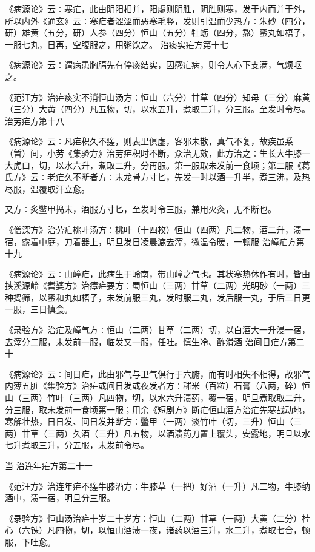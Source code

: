 \documentclass[a4paper,12pt,UTF8,twoside]{ctexbook}
\begin{document}
《病源论》云∶寒疟，此由阴阳相并，阳虚则阴胜，阴胜则寒，发于内而并于外，所以内外《通玄》云∶寒疟者涩涩而恶寒毛竖，发则引温而少热方∶朱砂（四分，研）雄黄（五分，研）人参（四分）恒山（五分）牡蛎（四分，熬）蜜丸如梧子，一服七丸，日再，空腹服之，用粥饮之。
治痰实疟方第十七

《病源论》云∶谓病患胸膈先有停痰结实，因感疟病，则令人心下支满，气烦呕之。

《范汪方》治疟痰实不消恒山汤方∶恒山（六分）甘草（四分）知母（三分）麻黄（三分）大黄（四分）凡五物，切，以水五升，煮取二升，分三服。至发时令尽。
治劳疟方第十八

《病源论》云∶凡疟积久不瘥，则表里俱虚，客邪未散，真气不复，故疾虽系（暂）间，小劳《集验方》治劳疟积时不断，众治无效，此方治之∶生长大牛膝一大虎口，切，以水六升，煮取二升，分再服。第一服取未发前一食顷；第二服《葛氏方》云∶老疟久不断者方∶末龙骨方寸匕，先发一时以酒一升半，煮三沸，及热尽服，温覆取汗立愈。

又方∶炙鳖甲捣末，酒服方寸匕，至发时令三服，兼用火灸，无不断也。

《僧深方》治劳疟桃叶汤方∶桃叶（十四枚）恒山（四两）凡二物，酒二升，渍一宿，露着中庭，刀着器上，明旦发日凌晨漉去滓，微温令暖，一顿服
治嶂疟方第十九

《病源论》云∶山嶂疟，此病生于岭南，带山嶂之气也。其状寒热休作有时，皆由挟溪源岭《耆婆方》治瘴疟要方∶蜀恒山（三两）甘草（二两）光明砂（一两）三种捣筛，以蜜和丸如梧子，未发前服三丸，发时服二丸，发后服一丸，于后三日更一服，三日慎食。

《录验方》治疟及嶂气方∶恒山（二两）甘草（二两）切，以白酒大一升浸一宿，去滓分二服，未发前一服，临发又一服，任吐。慎生冷、酢滑酒
治间日疟方第二十

《病源论》云∶间日疟，此由邪气与卫气俱行于六腑，而有时相失不相得，故邪气内薄五脏《集验方》治疟或间日发或夜发者方∶秫米（百粒）石膏（八两，碎）恒山（三两）竹叶（三两）凡四物，切，以水六升渍药，覆一宿，明旦煮取取二升，分三服，取未发前一食顷第一服；用余《短剧方》断疟恒山酒方治疟先寒战动地，寒解壮热，日日发、间日发并断方∶鳖甲（一两）淡竹叶（切，三升）恒山（三两）甘草（三两）久酒（三升）凡五物，以酒渍药刀置上覆头，安露地，明旦以水七升煮取三升，分五服，未发前令尽。

当
治连年疟方第二十一

《范汪方》治连年疟不瘥牛膝酒方∶牛膝草（一把）好酒（一升）凡二物，牛膝纳酒中，渍一宿，明旦分三服。

《录验方》恒山汤治疟十岁二十岁方∶恒山（二两）甘草（一两）大黄（二分）桂心（六铢）凡四物，切，以恒山酒渍一夜，诸药以酒三升，水二升，煮取七合，顿服，下吐愈。
\end{document}
